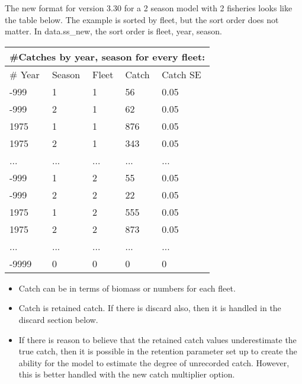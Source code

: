 The new format for version 3.30 for a 2 season model with 2 fisheries looks like the table below.  The example is sorted by fleet, but the sort order does not matter.  In data.ss\_new, the sort order is fleet, year, season.

\begin{center}
	\begin{tabular}{p{3cm} p{3cm} p{3cm} p{3cm} p{2cm}}
		\multicolumn{5}{l}{\#Catches by year, season for every fleet:}\\
		\hline
		\# Year & Season & Fleet & Catch & Catch SE \\
		\hline
		-999 & 1 & 1 & 56  & 0.05 \\
		-999 & 2 & 1 & 62  & 0.05 \\
		1975 & 1 & 1 & 876 & 0.05 \\
		1975 & 2 & 1 & 343 & 0.05 \\
		...  & ...   & ...   & ...   & ...  \\
		-999 & 1 & 2 & 55  & 0.05 \\
		-999 & 2 & 2 & 22  & 0.05 \\
		1975 & 1 & 2 & 555 & 0.05 \\
		1975 & 2 & 2 & 873 & 0.05 \\
		...  & ...   & ...   & ...   & ...  \\
		-9999 & 0 & 0 & 0 & 0 \\
		\hline
	\end{tabular}
\end{center}

\begin{itemize}
	\item Catch can be in terms of biomass or numbers for each fleet.
	\item Catch is retained catch. If there is discard also, then it is handled in the discard section below.
	\item If there is reason to believe that the retained catch values underestimate the true catch, then it is possible in the retention parameter set up to create the ability for the model to estimate the degree of unrecorded catch.  However, this is better handled with the new catch multiplier option.
\end{itemize}
